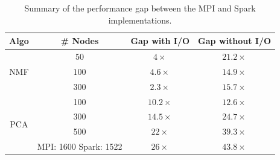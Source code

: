 \begin{table}[tbh]
\begin{center}
\begin{tabular}{|c|c|c|c|} \hline
Algo & \# Nodes & Gap with I/O & Gap without I/O\\ \hline
\multirow{3}{*}{NMF} & $50$ & $4\times$ & $21.2 \times$\\
{} & $100$  & $4.6\times$ & $14.9\times$\\
{} & $300$ & $2.3\times$ & $15.7\times$\\ \hline
\multirow{4}{*}{PCA} & 100 & $10.2\times$ & $12.6\times$\\
 {} & 300 & $14.5\times$ & $24.7\times$\\
 {} & 500 & $22\times$ & $39.3\times$\\ \cline{2-4}
 {} & {MPI: 1600 Spark: 1522} & $26\times$ & $43.8\times$\\ \hline
\end{tabular}
\end{center}
\caption{Summary of the performance gap between the MPI and Spark implementations.}
\label{tab:perfgaps}
\end{table}

